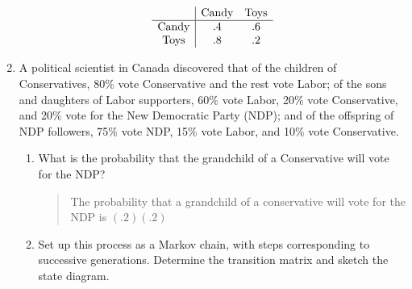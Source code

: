 \documentclass{hw}
\begin{document}
\begin{enumerate}
\begin{minipage}{0.5\textwidth}
\[
\begin{array}{c | c c}
& \text{Candy} & \text{Toys}\\
\hline
\text{Candy} & .4 & .6\\
\text{Toys} & .8 & .2
\end{array}
\]
\end{minipage}
\begin{minipage}{0.5\textwidth}
\begin{center}
\end{center}
\end{minipage}

\item A political scientist in Canada discovered that of the children of Conservatives, 80\% vote
Conservative and the rest vote Labor; of the sons and daughters of Labor supporters, 60\% vote
Labor, 20\% vote Conservative, and 20\% vote for the New Democratic Party (NDP); and of the
offspring of NDP followers, 75\% vote NDP, 15\% vote Labor, and 10\% vote Conservative.
\begin{enumerate}
\item What is the probability that the grandchild of a Conservative will vote for the NDP?
\begin{quote}
The probability that a grandchild of a conservative will vote for the NDP is $(.2)(.2)$
\end{quote}
\item Set up this process as a Markov chain, with steps corresponding to successive generations.
Determine the transition matrix and sketch the state diagram.


\end{enumerate}
\end{enumerate}
\end{document}
